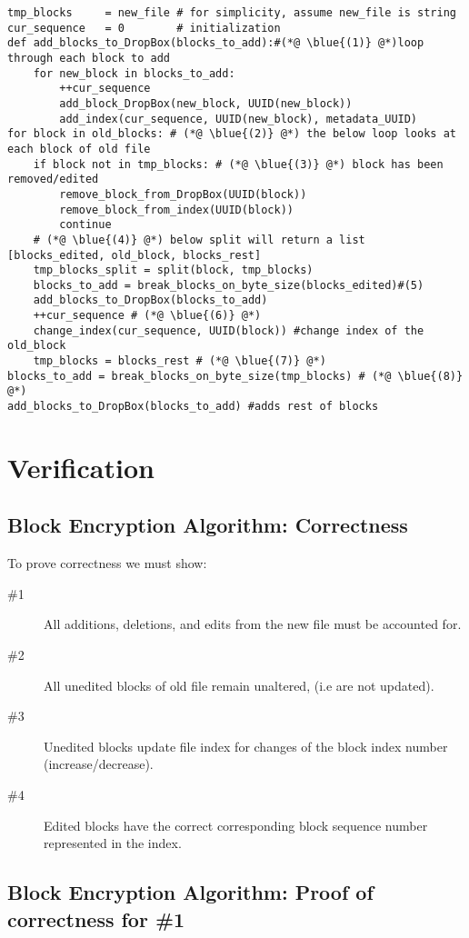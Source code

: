 \documentclass[11pt]{article}
\newcommand{\blue}[1]{\textcolor{blue}{#1}}
\begin{document}
\begin{lstlisting}
tmp_blocks     = new_file # for simplicity, assume new_file is string
cur_sequence   = 0  	  # initialization
def add_blocks_to_DropBox(blocks_to_add):#(*@ \blue{(1)} @*)loop through each block to add
	for new_block in blocks_to_add: 
		++cur_sequence
		add_block_DropBox(new_block, UUID(new_block)) 
		add_index(cur_sequence, UUID(new_block), metadata_UUID)
for block in old_blocks: # (*@ \blue{(2)} @*) the below loop looks at each block of old file
	if block not in tmp_blocks: # (*@ \blue{(3)} @*) block has been removed/edited
		remove_block_from_DropBox(UUID(block))
		remove_block_from_index(UUID(block))
		continue
	# (*@ \blue{(4)} @*) below split will return a list [blocks_edited, old_block, blocks_rest]
	tmp_blocks_split = split(block, tmp_blocks)
	blocks_to_add = break_blocks_on_byte_size(blocks_edited)#(5)
	add_blocks_to_DropBox(blocks_to_add)
	++cur_sequence # (*@ \blue{(6)} @*)
	change_index(cur_sequence, UUID(block)) #change index of the old_block 
	tmp_blocks = blocks_rest # (*@ \blue{(7)} @*)
blocks_to_add = break_blocks_on_byte_size(tmp_blocks) # (*@ \blue{(8)} @*)
add_blocks_to_DropBox(blocks_to_add) #adds rest of blocks
\end{lstlisting}   

\section{Verification}

\subsection{Block Encryption Algorithm: Correctness}

To prove correctness we must show: 
\begin{description}
\item[\#1] All additions, deletions, and edits from the new file must be accounted for. 
\item[\#2] All unedited blocks of old file remain unaltered, (i.e are not updated).
\item[\#3] Unedited blocks update file index for changes of the block index number (increase/decrease). \item[\#4] Edited blocks have the correct corresponding block sequence number represented in the index.
\end{description}

\subsection{Block Encryption Algorithm: Proof of correctness for \#1}
\end{document}
